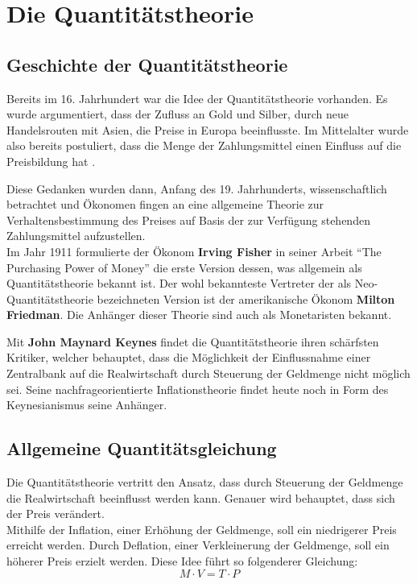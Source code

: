 \chapter{Die Quantitätstheorie}

\section{Geschichte der Quantitätstheorie}
Bereits im 16. Jahrhundert war die Idee der Quantitätstheorie vorhanden. Es wurde argumentiert, dass der Zufluss an Gold und Silber, durch neue Handelsrouten mit Asien, die Preise in Europa beeinflusste. Im Mittelalter wurde also bereits postuliert, dass die Menge der Zahlungsmittel einen Einfluss auf die Preisbildung hat \autocite{Woll1977}.

Diese Gedanken wurden dann, Anfang des 19. Jahrhunderts, wissenschaftlich betrachtet und Ökonomen fingen an eine allgemeine Theorie zur Verhaltensbestimmung des Preises auf Basis der zur Verfügung stehenden Zahlungsmittel aufzustellen.\\
Im Jahr 1911 formulierte der Ökonom \textbf{Irving Fisher} in seiner Arbeit \enquote{The Purchasing Power of Money} die erste Version dessen, was allgemein als Quantitätstheorie bekannt ist. Der wohl bekannteste Vertreter der als Neo-Quantitätstheorie bezeichneten Version ist der amerikanische Ökonom \textbf{Milton Friedman}. Die Anhänger dieser Theorie sind auch als Monetaristen bekannt.

Mit \textbf{John Maynard Keynes} findet die Quantitätstheorie ihren schärfsten Kritiker, welcher behauptet, dass die Möglichkeit der Einflussnahme einer Zentralbank auf die Realwirtschaft durch Steuerung der Geldmenge nicht möglich sei. Seine nachfrageorientierte Inflationstheorie findet heute noch in Form des Keynesianismus seine Anhänger.

\section{Allgemeine Quantitätsgleichung}

Die Quantitätstheorie vertritt den Ansatz, dass durch Steuerung der Geldmenge die Realwirtschaft beeinflusst werden kann. Genauer wird behauptet, dass sich der Preis verändert. \\
Mithilfe der Inflation, einer Erhöhung der Geldmenge, soll ein niedrigerer Preis erreicht werden. Durch Deflation, einer Verkleinerung der Geldmenge, soll ein höherer Preis erzielt werden. Diese Idee führt so folgenderer Gleichung:
\begin{equation}
    \tag{Allg. Quantitätsgleichung}
    M \cdot V = T \cdot P
\end{equation}\label{allg. Q-Formel}

